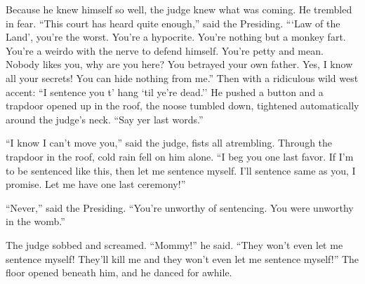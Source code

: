 \documentclass[oneside]{book}
\begin{document}
Because he knew himself so well, the judge knew what was coming.  He trembled in fear.
``This court has heard quite enough,'' said the Presiding.  {``}`Law of the Land', you're the worst.
You're a hypocrite.  You're nothing but a monkey fart.  You're a weirdo with the nerve to defend himself.
You're petty and mean.
Nobody likes you, why are you here?  You betrayed your own father.  Yes, I know all your secrets!  You can
hide nothing from me.''
Then with a ridiculous wild west accent:
``I sentence you t' hang `til ye're dead.''  He pushed a button and a trapdoor opened
up in the roof, the noose tumbled down, tightened automatically around the judge's neck.
``Say yer last words.''

``I know I can't move you,'' said the judge, fists all atrembling.  Through the trapdoor in the roof,
cold rain fell on him alone.  ``I beg you one last favor.
If I'm to be sentenced like this, then let me sentence myself.  I'll sentence same as you, I promise.  Let
me have one last ceremony!''

``Never,'' said the Presiding.  ``You're unworthy of sentencing.  You were unworthy in the womb.''

The judge sobbed and screamed.  ``Mommy!'' he said.  ``They won't even let me sentence myself!
They'll kill me and they won't even let me sentence myself!''  The floor opened beneath him,
and he danced for awhile.
\end{document}
